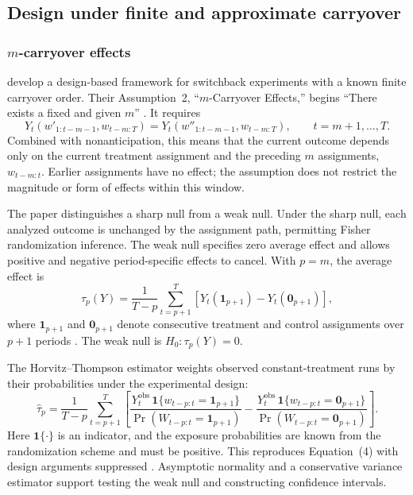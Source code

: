 \documentclass[12pt]{article}
\begin{document}
\subsection{Design under finite and approximate carryover}\label{sec:finite}

\subsubsection{$m$-carryover effects}

\citet{bojinov2023} develop a design-based framework for switchback experiments with a known finite carryover order. Their Assumption~2, ``$m$-Carryover Effects,'' begins ``There exists a fixed and given $m$'' \citep[Assumption~2, p.~3762; PDF p.~4]{bojinov2023}. It requires
\begin{equation}\label{eq:finite-memory-original}
Y_t(w'_{1:t-m-1},w_{t-m:T})
=Y_t(w''_{1:t-m-1},w_{t-m:T}),
\qquad t=m+1,\ldots,T.
\end{equation}
Combined with nonanticipation, this means that the current outcome depends only on the current treatment assignment and the preceding $m$ assignments, $w_{t-m:t}$. Earlier assignments have no effect; the assumption does not restrict the magnitude or form of effects within this window.

The paper distinguishes a sharp null from a weak null. Under the sharp null, each analyzed outcome is unchanged by the assignment path, permitting Fisher randomization inference. The weak null specifies zero average effect and allows positive and negative period-specific effects to cancel. With $p=m$, the average effect is
\begin{equation}\label{eq:finite-memory-estimand}
\tau_p(Y)=\frac{1}{T-p}\sum_{t=p+1}^{T}
\left[Y_t(\mathbf{1}_{p+1})-Y_t(\mathbf{0}_{p+1})\right],
\end{equation}
where $\mathbf{1}_{p+1}$ and $\mathbf{0}_{p+1}$ denote consecutive treatment and control assignments over $p+1$ periods \citep[Eq.~(1), p.~3762]{bojinov2023}. The weak null is $H_0:\tau_p(Y)=0$.

The Horvitz--Thompson estimator weights observed constant-treatment runs by their probabilities under the experimental design:
\begin{equation}\label{eq:finite-memory-estimator}
\widehat{\tau}_p
=\frac{1}{T-p}\sum_{t=p+1}^{T}\left[
\frac{Y_t^{\mathrm{obs}}\,\mathbf{1}\{w_{t-p:t}=\mathbf{1}_{p+1}\}}
     {\Pr(W_{t-p:t}=\mathbf{1}_{p+1})}
-\frac{Y_t^{\mathrm{obs}}\,\mathbf{1}\{w_{t-p:t}=\mathbf{0}_{p+1}\}}
      {\Pr(W_{t-p:t}=\mathbf{0}_{p+1})}
\right].
\end{equation}
Here $\mathbf{1}\{\cdot\}$ is an indicator, and the exposure probabilities are known from the randomization scheme and must be positive. This reproduces Equation~(4) with design arguments suppressed \citep[pp.~3763--3764]{bojinov2023}. Asymptotic normality and a conservative variance estimator support testing the weak null and constructing confidence intervals.
\end{document}
